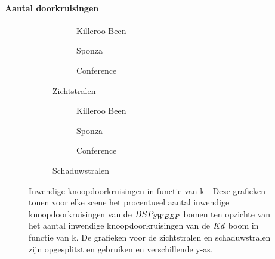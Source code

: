 \begin{figure}
  \centering
  
\end{figure}

\paragraph{Aantal doorkruisingen}
\begin{figure}
  \centering
  \begin{subfigure}{\linewidth}
  \centering
  \begin{subfigure}[t]{.32\linewidth}
    \centering
{}
\caption{Killeroo Been}
  \end{subfigure}
  \begin{subfigure}[t]{.32\linewidth}
    \centering
{}
\caption{Sponza}
\end{subfigure}
\begin{subfigure}[t]{.32\linewidth}
  \centering
{}
\caption{Conference}
\end{subfigure}
\caption{Zichtstralen}
\end{subfigure}
  \begin{subfigure}{\linewidth}
  \centering
  \begin{subfigure}[t]{.32\linewidth}
    \centering
{}
  \caption{Killeroo Been}
  \end{subfigure}
  \begin{subfigure}[t]{.32\linewidth}
    \centering
{}
\caption{Sponza}
\end{subfigure}
\begin{subfigure}[t]{.32\linewidth}
  \centering
{}
\caption{Conference}
\end{subfigure}
\caption{Schaduwstralen}
\end{subfigure}
\caption[Inwendige knoopdoorkruisingen in functie van k]{Inwendige knoopdoorkruisingen in functie van k - \small Deze grafieken tonen voor elke scene het procentueel aantal inwendige knoopdoorkruisingen van de $BSP_{SWEEP}$ bomen ten opzichte van het aantal inwendige knoopdoorkruisingen van de $Kd$ boom in functie van k. De grafieken voor de zichtstralen en schaduwstralen zijn opgesplitst en gebruiken en verschillende y-as.}
\label{fig:k-doorkruisingen}
\end{figure}


